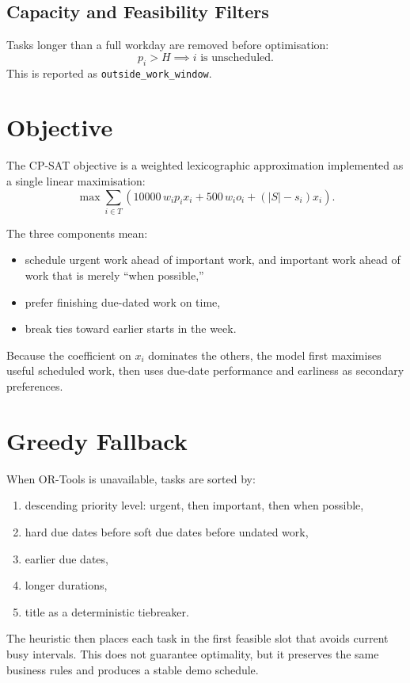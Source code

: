 \documentclass[11pt]{article}
\begin{document}
\subsection{Capacity and Feasibility Filters}
Tasks longer than a full workday are removed before optimisation:
\[
p_i > H \implies i \text{ is unscheduled.}
\]
This is reported as \texttt{outside\_work\_window}.

\section{Objective}
The CP-SAT objective is a weighted lexicographic approximation implemented as a single linear
maximisation:
\[
\max \sum_{i \in T}
\left(
10000 \, w_i p_i x_i
+ 500 \, w_i o_i
+ (|S| - s_i) x_i
\right).
\]

The three components mean:
\begin{itemize}
  \item schedule urgent work ahead of important work, and important work ahead of work that is merely ``when possible,''
  \item prefer finishing due-dated work on time,
  \item break ties toward earlier starts in the week.
\end{itemize}

Because the coefficient on \(x_i\) dominates the others, the model first maximises useful
scheduled work, then uses due-date performance and earliness as secondary preferences.

\section{Greedy Fallback}
When OR-Tools is unavailable, tasks are sorted by:
\begin{enumerate}
  \item descending priority level: urgent, then important, then when possible,
  \item hard due dates before soft due dates before undated work,
  \item earlier due dates,
  \item longer durations,
  \item title as a deterministic tiebreaker.
\end{enumerate}
The heuristic then places each task in the first feasible slot that avoids current busy intervals.
This does not guarantee optimality, but it preserves the same business rules and produces a stable
demo schedule.
\end{document}
